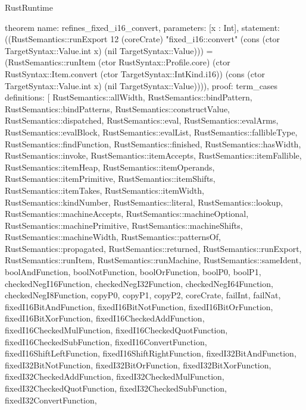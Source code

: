 \begin{lexlean}{RustRuntime}
\begin{semanticmodule}
theorem{
  name: refines_fixed_i16_convert,
  parameters: [x : Int],
  statement: ((RustSemantics::runExport 12 (coreCrate) "fixed_i16::convert" (cons (ctor TargetSyntax::Value.int x) (nil TargetSyntax::Value))) = (RustSemantics::runItem (ctor RustSyntax::Profile.core) (ctor RustSyntax::Item.convert (ctor TargetSyntax::IntKind.i16)) (cons (ctor TargetSyntax::Value.int x) (nil TargetSyntax::Value)))),
  proof: term_cases{
    definitions: [
      RustSemantics::allWidth,
      RustSemantics::bindPattern,
      RustSemantics::bindPatterns,
      RustSemantics::constructValue,
      RustSemantics::dispatched,
      RustSemantics::eval,
      RustSemantics::evalArms,
      RustSemantics::evalBlock,
      RustSemantics::evalList,
      RustSemantics::fallibleType,
      RustSemantics::findFunction,
      RustSemantics::finished,
      RustSemantics::hasWidth,
      RustSemantics::invoke,
      RustSemantics::itemAccepts,
      RustSemantics::itemFallible,
      RustSemantics::itemHeap,
      RustSemantics::itemOperands,
      RustSemantics::itemPrimitive,
      RustSemantics::itemShifts,
      RustSemantics::itemTakes,
      RustSemantics::itemWidth,
      RustSemantics::kindNumber,
      RustSemantics::literal,
      RustSemantics::lookup,
      RustSemantics::machineAccepts,
      RustSemantics::machineOptional,
      RustSemantics::machinePrimitive,
      RustSemantics::machineShifts,
      RustSemantics::machineWidth,
      RustSemantics::patternsOf,
      RustSemantics::propagated,
      RustSemantics::returned,
      RustSemantics::runExport,
      RustSemantics::runItem,
      RustSemantics::runMachine,
      RustSemantics::sameIdent,
      boolAndFunction,
      boolNotFunction,
      boolOrFunction,
      boolP0,
      boolP1,
      checkedNegI16Function,
      checkedNegI32Function,
      checkedNegI64Function,
      checkedNegI8Function,
      copyP0,
      copyP1,
      copyP2,
      coreCrate,
      failInt,
      failNat,
      fixedI16BitAndFunction,
      fixedI16BitNotFunction,
      fixedI16BitOrFunction,
      fixedI16BitXorFunction,
      fixedI16CheckedAddFunction,
      fixedI16CheckedMulFunction,
      fixedI16CheckedQuotFunction,
      fixedI16CheckedSubFunction,
      fixedI16ConvertFunction,
      fixedI16ShiftLeftFunction,
      fixedI16ShiftRightFunction,
      fixedI32BitAndFunction,
      fixedI32BitNotFunction,
      fixedI32BitOrFunction,
      fixedI32BitXorFunction,
      fixedI32CheckedAddFunction,
      fixedI32CheckedMulFunction,
      fixedI32CheckedQuotFunction,
      fixedI32CheckedSubFunction,
      fixedI32ConvertFunction,
}}
\end{semanticmodule}
\end{lexlean}
